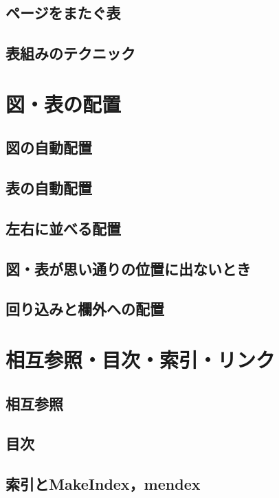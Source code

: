 \documentclass{jsbook}
\begin{document}
\section{ページをまたぐ表}

\section{表組みのテクニック}

\chapter{図・表の配置}

\section{図の自動配置}

\section{表の自動配置}

\section{左右に並べる配置}

\section{図・表が思い通りの位置に出ないとき}

\section{回り込みと欄外への配置}

\chapter{相互参照・目次・索引・リンク}

\section{相互参照}

\section{目次}

\section{索引とMakeIndex，mendex}
\end{document}
